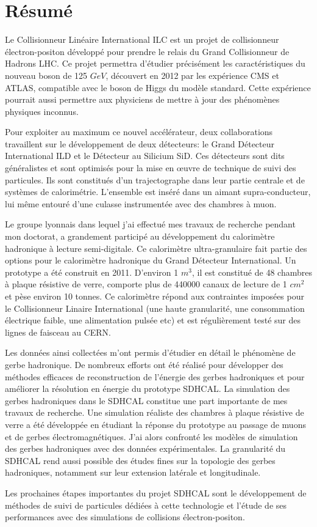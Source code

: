 \chapter*{Résumé}

Le Collisionneur Linéaire International ILC est un projet de collisionneur électron-positon développé pour prendre le relais du Grand Collisionneur de Hadrons LHC. Ce projet permettra d'étudier précisément les caractéristiques du nouveau boson de 125 $GeV$, découvert en 2012 par les expérience CMS et ATLAS, compatible avec le boson de Higgs du modèle standard. Cette expérience pourrait aussi permettre aux physiciens de mettre à jour des phénomènes physiques inconnus. 

Pour exploiter au maximum ce nouvel accélérateur, deux collaborations travaillent sur le développement de deux détecteurs: le Grand Détecteur International ILD et le Détecteur au Silicium SiD. Ces détecteurs sont dits généralistes et sont optimisés pour la mise en œuvre de technique de suivi des particules. Ils sont constitués d'un trajectographe dans leur partie centrale et de systèmes de calorimétrie. L'ensemble est inséré dans un aimant supra-conducteur, lui même entouré d'une culasse instrumentée avec des chambres à muon.

Le groupe lyonnais dans lequel j'ai effectué mes travaux de recherche pendant mon doctorat, a grandement participé au développement du calorimètre hadronique à lecture semi-digitale. Ce calorimètre ultra-granulaire fait partie des options pour le calorimètre hadronique du Grand Détecteur International. Un prototype a été construit en 2011. D'environ 1 $m^3$, il est constitué de 48 chambres à plaque résistive de verre, comporte plus de 440000 canaux de lecture de 1 $cm^2$ et pèse environ 10 tonnes. Ce calorimètre répond aux contraintes imposées pour le Collisionneur Linaire International (une haute granularité, une consommation électrique faible, une alimentation pulsée etc) et est régulièrement testé sur des lignes de faisceau au CERN. 

Les données ainsi collectées m'ont permis d'étudier en détail le phénomène de gerbe hadronique. De nombreux efforts ont été réalisé pour développer des méthodes efficaces de reconstruction de l'énergie des gerbes hadroniques et pour améliorer la résolution en énergie du prototype SDHCAL. La simulation des gerbes hadroniques dans le SDHCAL constitue une part importante de mes travaux de recherche. Une simulation réaliste des chambres à plaque résistive de verre a été développée en étudiant la réponse du prototype au passage de muons et de gerbes électromagnétiques. J'ai alors confronté les modèles de simulation des gerbes hadroniques avec des données expérimentales. La granularité du SDHCAL rend aussi possible des études fines sur la topologie des gerbes hadroniques, notamment sur leur extension latérale et longitudinale.
 
Les prochaines étapes importantes du projet SDHCAL sont le développement de méthodes de suivi de particules dédiées à cette technologie et l'étude de ses performances avec des simulations de collisions électron-positon. 
